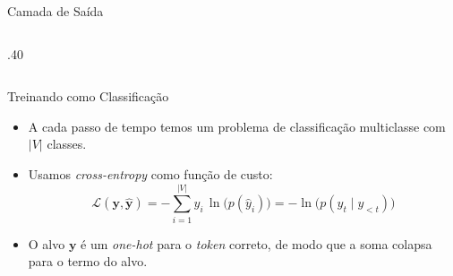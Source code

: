 \documentclass[aspectratio=169,xcolor=dvipsnames]{beamer}
\begin{document}
\begin{frame}{Camada de Saída}
\begin{columns}
\begin{column}{.40\linewidth}
    \end{column}
\end{columns}
\end{frame}

\begin{frame}{Treinando como Classificação}
\begin{itemize}
    \item A cada passo de tempo temos um problema de classificação multiclasse com $|V|$ classes.
    \item Usamos \textit{cross-entropy} como função de custo:
    \begin{equation*}
        \mathcal{L}(\mathbf{y}, \hat{\mathbf{y}}) = -\sum_{i=1}^{|V|} y_i \, \ln\bigl(p(\hat{y}_i)\bigr) = -\ln\bigl(p(y_t \mid y_{<t})\bigr)
    \end{equation*}
    \item O alvo $\mathbf{y}$ é um \textit{one-hot} para o \textit{token} correto, de modo que a soma colapsa para o termo do alvo.
\end{itemize}
\end{frame}
\end{document}
